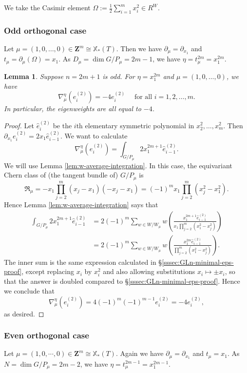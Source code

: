 \documentclass[reqno]{amsart}
\numberwithin{equation}{subsection}
\newtheorem{lemma}[subsubsection]{Lemma}
\theoremstyle{definition}
\newcommand\frR{\mathfrak{R}}
\newcommand\xcoch{\mathbb{X}_*}
\newcommand{\wh}[1]{\widehat{#1}}
\newcommand\pl{\partial}
\newcommand{\Z}{\mathbf{Z}}
\begin{document}
We take the Casimir element $\Omega := \frac{1}{2} \sum_{i=1}^m x_i^2 \in R^W$. 

\subsubsection{Odd orthogonal case} \label{ss:O odd}
Let $\mu=(1,0,\ldots,0) \in \Z^m \cong \xcoch(T)$. Then we have $\pl_{\mu}=\pl_{x_{1}}$ and $t_{\mu}= \partial_{\mu}(\Omega) = x_{1}$. As $D_\mu = \dim G/P_\mu =  2m-1$, we have $\eta = t_\mu^{2m} = x_1^{2m}$. 

\begin{lemma}
Suppose $n=2m+1$ is odd. For $\eta = x_1^{2m}$ and $\mu=(1,0,\ldots,0)$, we have 
\[
\nabla^\eta_\mu(e_i^{(2)}) = -4 e_i^{(2)} \quad \text{ for all } i = 1, 2, \ldots, m.
\]
In particular, the eigenweights are all equal to $-4$. 
\end{lemma}

\begin{proof}
Let $\wh{e}_i^{(2)}$ be the $i$th elementary symmetric polynomial in $x_2^2, \ldots, x_m^2$. Then $\partial_{x_1} e_i^{(2)} = 2 x_1  \wh{e}_{i-1}^{(2)}$. We want to calculate 
\[
\nabla_\mu^\eta(e_i^{(2)}) =  \int_{G/P_\mu} 2 x_1^{2m+1}  \wh{e}_{i-1}^{(2)}.
\]
We will use Lemma \ref{lem:w-average-integration}. In this case, the equivariant Chern class of (the tangent bundle of) $G/P_\mu$ is 
\[
\frR_\mu =  -x_1 \prod_{j=2}^m (x_j-x_1)(-x_j-x_1) = (-1)^m x_1 \prod_{j=2}^m (x_j^2-x_1^2).
\]
Hence Lemma \ref{lem:w-average-integration} says that 
\begin{align}
\int_{G/P_\mu} 2x_1^{2m+1}  \wh{e}_{i-1}^{(2)} &=  2 (-1)^m \sum_{w \in W/W_\mu} w   \left(\frac{x_1^{2m+1} \wh{e}_{i-1}^{(2)}}{ x_1 \prod_{j=2}^m (x_1^2-x_j^2)} \right) \\
&= 2(-1)^m \sum_{w \in W/W_\mu} w  \left( \frac{x_1^{2m} \wh{e}_{i-1}^{(2)}}{ \prod_{j=2}^m (x_1^2-x_j^2)} \right).
\end{align}
The inner sum is the same expression calculated in \S \ref{sssec:GLn-minimal-eps-proof}, except replacing $x_i$ by $x_i^2$ and also allowing substitutions $x_i \mapsto \pm x_i$, so that the answer is doubled compared to \S \ref{sssec:GLn-minimal-eps-proof}. Hence we conclude that 
\[
\nabla_\mu^\eta(e_i^{(2)})  = 4 (-1)^m (-1)^{m-1} e_i^{(2)} = -4 e_i^{(2)},
\]
as desired. 
\end{proof}

\subsubsection{Even orthogonal case} Let $\mu=(1,0,\cdots,0) \in \Z^m \cong \xcoch(T)$. Again we have $\pl_{\mu}=\pl_{x_{1}}$ and $t_{\mu}=x_{1}$. As $N = \dim G/P_\mu =  2m-2$, we have $\eta = t_\mu^{2m-1} = x_1^{2m-1}$. 
\end{document}

